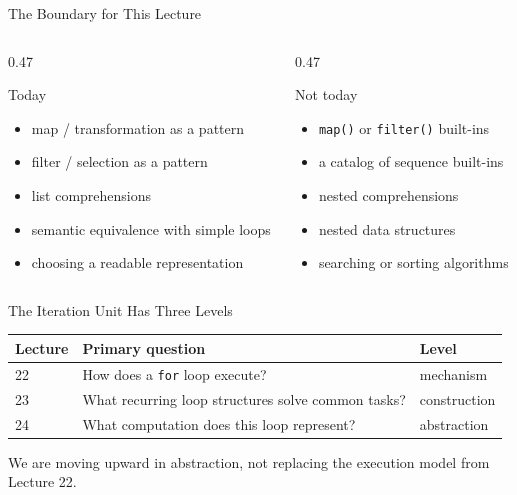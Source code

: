 \documentclass[aspectratio=169,10pt]{beamer}
\begin{document}
\begin{frame}{The Boundary for This Lecture}
  \begin{columns}[T,onlytextwidth]
    \begin{column}{0.47\textwidth}
      \begin{block}{Today}
        \begin{itemize}
          \item map / transformation as a pattern
          \item filter / selection as a pattern
          \item list comprehensions
          \item semantic equivalence with simple loops
          \item choosing a readable representation
        \end{itemize}
      \end{block}
    \end{column}
    \begin{column}{0.47\textwidth}
      \begin{alertblock}{Not today}
        \begin{itemize}
          \item \texttt{map()} or \texttt{filter()} built-ins
          \item a catalog of sequence built-ins
          \item nested comprehensions
          \item nested data structures
          \item searching or sorting algorithms
        \end{itemize}
      \end{alertblock}
    \end{column}
  \end{columns}
\end{frame}


\begin{frame}{The Iteration Unit Has Three Levels}
  \begin{center}
    \renewcommand{\arraystretch}{1.35}
    \begin{tabular}{l|l|l}
      \textbf{Lecture} & \textbf{Primary question} & \textbf{Level} \\\hline
      22 & How does a \texttt{for} loop execute? & mechanism \\
      23 & What recurring loop structures solve common tasks? & construction \\
      24 & What computation does this loop represent? & abstraction
    \end{tabular}
  \end{center}

  \begin{keyidea}
    We are moving upward in abstraction, not replacing the execution model from Lecture 22.
  \end{keyidea}
\end{frame}
\end{document}
